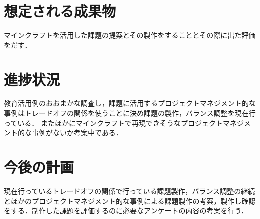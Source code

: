\documentclass[uplatex,twocolumn,dvipdfmx]{jsarticle}
\begin{document}
\section{想定される成果物}
マインクラフトを活用した課題の提案とその製作をすることとその際に出た評価をだす．

\section{進捗状況}
教育活用例のおおまかな調査し，課題に活用するプロジェクトマネジメント的な事例はトレードオフの関係を使うことに決め課題の製作，バランス調整を現在行っている．
またほかにマインクラフトで再現できそうなプロジェクトマネジメント的な事例がないか考案中である．


\section{今後の計画}
現在行っているトレードオフの関係で行っている課題製作，バランス調整の継続とほかのプロジェクトマネジメント的な事例による課題製作の考案，製作し確認をする．制作した課題を評価するのに必要なアンケートの内容の考案を行う．



\end{document}
